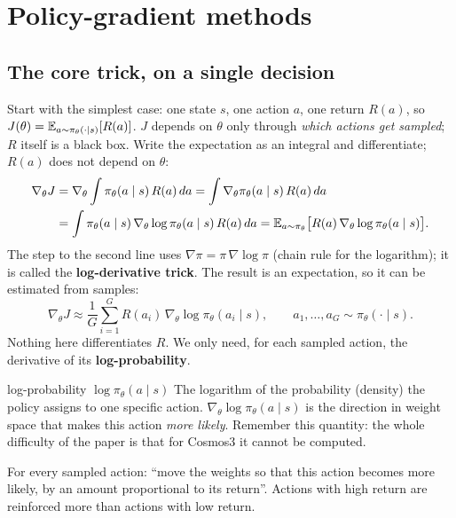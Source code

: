 \section{Policy-gradient methods}\label{fpo:sec:pg}

\subsection{The core trick, on a single decision}
Start with the simplest case: one state $s$, one action $a$, one return $R(a)$, so $J(\theta)=\mathbb{E}_{a\sim\pi_\theta(\cdot\mid s)}[R(a)]$. $J$ depends on $\theta$ only through \emph{which actions get sampled}; $R$ itself is a black box. Write the expectation as an integral and differentiate; $R(a)$ does not depend on $\theta$:
\begin{align}
\nabla_\theta J
&=\nabla_\theta\int\pi_\theta(a\mid s)\,R(a)\,da
=\int\nabla_\theta\pi_\theta(a\mid s)\,R(a)\,da \notag\\
&=\int\pi_\theta(a\mid s)\,\nabla_\theta\log\pi_\theta(a\mid s)\,R(a)\,da
=\mathbb{E}_{a\sim\pi_\theta}\big[R(a)\,\nabla_\theta\log\pi_\theta(a\mid s)\big].
\label{fpo:eq:pg}
\end{align}
The step to the second line uses $\nabla\pi=\pi\,\nabla\log\pi$ (chain rule for the logarithm); it is called the \textbf{log-derivative trick}. The result is an expectation, so it can be estimated from samples:
\begin{equation}
\nabla_\theta J\approx\frac1G\sum_{i=1}^{G}R(a_i)\,\nabla_\theta\log\pi_\theta(a_i\mid s),\qquad a_1,\dots,a_G\sim\pi_\theta(\cdot\mid s).
\label{fpo:eq:pg-est}
\end{equation}
Nothing here differentiates $R$. We only need, for each sampled action, the derivative of its \textbf{log-probability}.

\begin{newc}{log-probability $\log\pi_\theta(a\mid s)$}
The logarithm of the probability (density) the policy assigns to one specific action. $\nabla_\theta\log\pi_\theta(a\mid s)$ is the direction in weight space that makes this action \emph{more likely}. Remember this quantity: the whole difficulty of the paper is that for Cosmos3 it cannot be computed.
\end{newc}

\begin{intuition}
For every sampled action: ``move the weights so that this action becomes more likely, by an amount proportional to its return''. Actions with high return are reinforced more than actions with low return.
\end{intuition}

